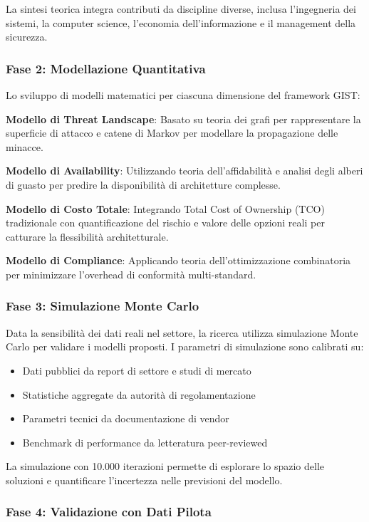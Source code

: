 \begin{bibunit}[IEEEtran]
La sintesi teorica integra contributi da discipline diverse, inclusa l'ingegneria dei sistemi, la computer science, l'economia dell'informazione e il management della sicurezza.

\subsubsection{Fase 2: Modellazione Quantitativa}

Lo sviluppo di modelli matematici per ciascuna dimensione del framework GIST:

\textbf{Modello di Threat Landscape}: Basato su teoria dei grafi per rappresentare la superficie di attacco e catene di Markov per modellare la propagazione delle minacce.

\textbf{Modello di Availability}: Utilizzando teoria dell'affidabilità e analisi degli alberi di guasto per predire la disponibilità di architetture complesse.

\textbf{Modello di Costo Totale}: Integrando Total Cost of Ownership (TCO) tradizionale con quantificazione del rischio e valore delle opzioni reali per catturare la flessibilità architetturale.

\textbf{Modello di Compliance}: Applicando teoria dell'ottimizzazione combinatoria per minimizzare l'overhead di conformità multi-standard.

\subsubsection{Fase 3: Simulazione Monte Carlo}

Data la sensibilità dei dati reali nel settore, la ricerca utilizza simulazione Monte Carlo per validare i modelli proposti. I parametri di simulazione sono calibrati su:
\begin{itemize}
\item Dati pubblici da report di settore e studi di mercato
\item Statistiche aggregate da autorità di regolamentazione
\item Parametri tecnici da documentazione di vendor
\item Benchmark di performance da letteratura peer-reviewed
\end{itemize}

La simulazione con 10.000 iterazioni permette di esplorare lo spazio delle soluzioni e quantificare l'incertezza nelle previsioni del modello.

\subsubsection{Fase 4: Validazione con Dati Pilota}


\end{bibunit}
